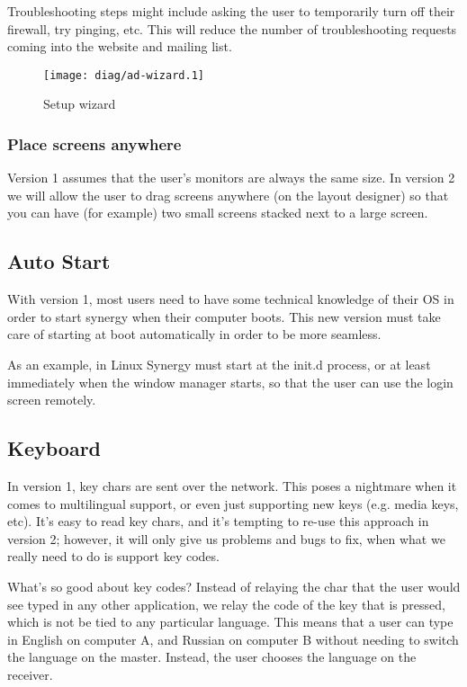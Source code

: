 Troubleshooting steps might include asking the user to temporarily turn off
their firewall, try pinging, etc. This will reduce the number of troubleshooting
requests coming into the website and mailing list.

\clearpage
\begin{figure}[ht!]
  \centering
  \texttt{[image: diag/ad-wizard.1]}
  \caption{Setup wizard}
  \label{fig:setupWizard}
\end{figure}

\subsubsection{Place screens anywhere}

Version 1 assumes that the user's monitors are always the same size. In version
2 we will allow the user to drag screens anywhere (on the layout designer) so
that you can have (for example) two small screens stacked next to a large 
screen.

\subsection{Auto Start}

With version 1, most users need to have some technical knowledge of their OS
in order to start synergy when their computer boots. This new version must
take care of starting at boot automatically in order to be more seamless.

As an example, in Linux Synergy 
must start at the init.d process, or at least immediately when the window 
manager starts, so that the user can use the login screen remotely.

\subsection{Keyboard}

 
In version 1, key chars are sent over the network. This poses a nightmare when
it comes to multilingual support, or even just supporting new keys (e.g. media
keys, etc). It's easy to read key chars, and it's tempting to re-use this 
approach in version 2; however, it will only give us problems and bugs to fix,
when what we really need to do is support key codes.

What's so good about key codes? Instead of relaying the char that the user would
see typed in any other application, we relay the code of the key that is 
pressed, which is not be tied to any particular language. This means that a user
can type in English on computer A, and Russian on computer B without needing to
switch the language on the master. Instead, the user chooses the language on
the receiver.

